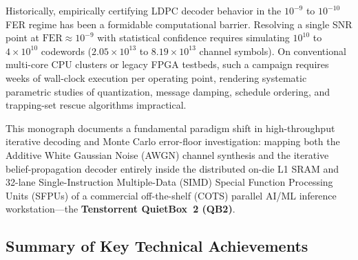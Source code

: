 \documentclass[10pt]{article}
\begin{document}
Historically, empirically certifying LDPC decoder behavior in the $10^{-9}$ to $10^{-10}$ FER regime has been a formidable computational barrier. Resolving a single SNR point at $\mathrm{FER} \approx 10^{-9}$ with statistical confidence requires simulating $10^{10}$ to $4 \times 10^{10}$ codewords ($2.05 \times 10^{13}$ to $8.19 \times 10^{13}$ channel symbols). On conventional multi-core CPU clusters or legacy FPGA testbeds, such a campaign requires weeks of wall-clock execution per operating point, rendering systematic parametric studies of quantization, message damping, schedule ordering, and trapping-set rescue algorithms impractical.

This monograph documents a fundamental paradigm shift in high-throughput iterative decoding and Monte Carlo error-floor investigation: mapping both the Additive White Gaussian Noise (AWGN) channel synthesis and the iterative belief-propagation decoder entirely inside the distributed on-die L1 SRAM and 32-lane Single-Instruction Multiple-Data (SIMD) Special Function Processing Units (SFPUs) of a commercial off-the-shelf (COTS) parallel AI/ML inference workstation---the \textbf{Tenstorrent QuietBox~2 (QB2)}.

\subsection{Summary of Key Technical Achievements}
\end{document}
